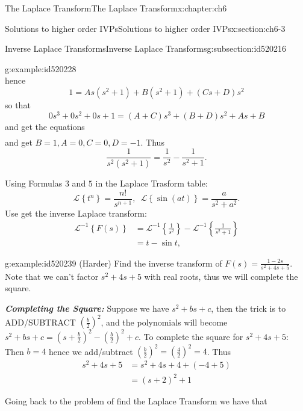 \documentclass[oneside,10pt,]{book}
\newcommand{\alert}[1]{\textbf{\textit{#1}}}
\numberwithin{equation}{section}
\numberwithin{equation}{section}
\newcommand{\amp}{&}
\begin{document}
\begin{chapterptx}{The Laplace Transform}{}{The Laplace Transform}{}{}{x:chapter:ch6}
\begin{sectionptx}{Solutions to higher order IVPs}{}{Solutions to higher order IVPs}{}{}{x:section:ch6-3}
\begin{subsectionptx}{Inverse Laplace Transforms}{}{Inverse Laplace Transforms}{}{}{g:subsection:id520216}
\begin{example}{}{g:example:id520228}
\begin{equation*}
\end{equation*}
hence%
\begin{equation*}
1=As\left(s^{2}+1\right)+B\left(s^{2}+1\right)+\left(Cs+D\right)s^{2}
\end{equation*}
so that%
\begin{equation*}
0s^{3}+0s^{2}+0s+1=\left(A+C\right)s^{3}+\left(B+D\right)s^{2}+As+B
\end{equation*}
and get the equations%
\begin{align*}
\end{align*}
and get \(B=1,A=0,C=0,D=-1\). Thus%
\begin{equation*}
\frac{1}{s^{2}\left(s^{2}+1\right)}=\frac{1}{s^{2}}-\frac{1}{s^{2}+1}.
\end{equation*}
%
\par
Using Formulas \(3\) and \(5\) in the Laplace Trasform table:%
\begin{equation*}
\mathcal{L}\left\{ t^{n}\right\} =\frac{n!}{s^{n+1}},\,\,\,\mathcal{L}\left\{ \sin(at)\right\} =\frac{a}{s^{2}+a^{2}}.
\end{equation*}
Use get the inverse Laplace transform:%
\begin{align*}
\mathcal{L}^{-1}\left\{ F(s)\right\}  \amp =\mathcal{L}^{-1}\left\{ \frac{1}{s^{2}}\right\} -\mathcal{L}^{-1}\left\{ \frac{1}{s^{2}+1}\right\} \\
\amp =t-\sin t,
\end{align*}
%
\end{example}
\begin{example}{}{g:example:id520239}%
(Harder) Find the inverse transform of \(F(s)=\frac{1-2s}{s^{2}+4s+5}\). Note that we can't factor \(s^{2}+4s+5\) with real roots, thus we will complete the square.%
\par
\alert{Completing the Square:} Suppose we have \(s^{2}+bs+c\), then the trick is to ADD\slash{}SUBTRACT \(\left(\frac{b}{2}\right)^{2}\), and the polynomials will become \(s^{2}+bs+c=\left(s+\frac{b}{2}\right)^{2}-\left(\frac{b}{2}\right)^{2}+c\). To complete the square for \(s^{2}+4s+5\): Then \(b=4\) hence we add\slash{}subtract \(\left(\frac{b}{2}\right)^{2}=\left(\frac{4}{2}\right)^{2}=4\). Thus%
\begin{align*}
s^{2}+4s+5 \amp =s^{2}+4s+4+\left(-4+5\right)\\
\amp =\left(s+2\right)^{2}+1
\end{align*}
%
\par
Going back to the problem of find the Laplace Transform we have that%
\begin{align*}

\end{align*}
\end{example}
\end{subsectionptx}
\end{sectionptx}
\end{chapterptx}
\end{document}
